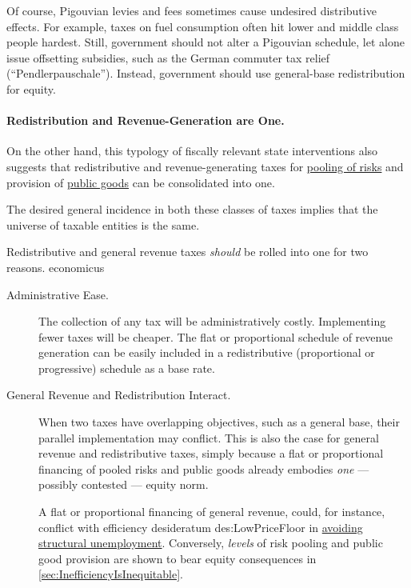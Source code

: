 Of course, Pigouvian levies and fees sometimes cause undesired distributive effects.
For example, taxes on fuel consumption often hit lower and middle class people hardest.
Still, government should not alter a Pigouvian schedule, let alone issue offsetting subsidies, such as the German commuter tax relief (``Pendlerpauschale'').
Instead, government should use general-base redistribution for equity.

\paragraph{Redistribution and Revenue-Generation are One.}
	\label{sec:RedistributionAndRevenueAreOne}
On the other hand, this typology of fiscally relevant state interventions also suggests that redistributive and revenue-generating taxes for \hyperref[sec:RiskPooling]{pooling of risks} and provision of \hyperref[sec:PublicGoods]{public goods} can be consolidated into one.

The desired general incidence in both these classes of taxes implies that the universe of taxable entities is the same.

Redistributive and general revenue taxes \emph{should} be rolled into one for two reasons.
economicus
\begin{description}
	\item[Administrative Ease.]
	The collection of any tax will be administratively costly.
	Implementing fewer taxes will be cheaper.
	The flat or proportional schedule of revenue generation can be easily included in a redistributive (proportional or progressive) schedule as a base rate.

	\item[General Revenue and Redistribution Interact.]
	When two taxes have overlapping objectives, such as a general base, their parallel implementation may conflict.
	This is also the case for general revenue and redistributive taxes, simply because a flat or proportional financing of pooled risks and public goods already embodies \emph{one} --- possibly contested --- equity norm.

	A flat or proportional financing of general revenue, could, for instance, conflict with efficiency desideratum	{des:LowPriceFloor} in \hyperref[des:LowPriceFloor]{avoiding structural unemployment}.
	Conversely, \emph{levels} of risk pooling and public good provision are shown to bear equity consequences in \autoref{sec:InefficiencyIsInequitable}.
\end{description}


